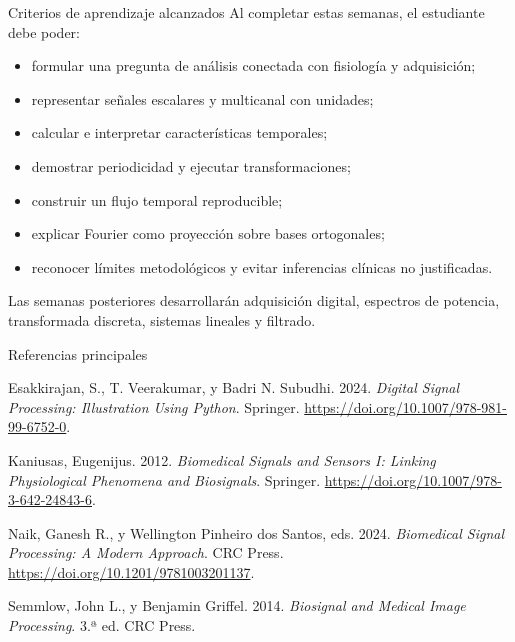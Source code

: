 \documentclass[
  ignorenonframetext,
  aspectratio=169,
  spanish,
  professionalfonts]{beamer}
\newlength{\cslhangindent}
\newenvironment{CSLReferences}[2] %
 {\begin{list}{}{%
  \setlength{\itemindent}{0pt}
  \setlength{\leftmargin}{0pt}
  \setlength{\parsep}{0pt}
  \ifodd #1
   \setlength{\leftmargin}{\cslhangindent}
   \setlength{\itemindent}{-1\cslhangindent}
  \fi
  \setlength{\itemsep}{#2\baselineskip}}}
 {\end{list}}
\providecommand{\tightlist}{%
  \setlength{\itemsep}{0pt}\setlength{\parskip}{0pt}}
\begin{document}
\begin{frame}{Criterios de aprendizaje alcanzados}
\protect{}\label{criterios-de-aprendizaje-alcanzados}
Al completar estas semanas, el estudiante debe poder:

\begin{itemize}
\tightlist
\item
  formular una pregunta de análisis conectada con fisiología y
  adquisición;
\item
  representar señales escalares y multicanal con unidades;
\item
  calcular e interpretar características temporales;
\item
  demostrar periodicidad y ejecutar transformaciones;
\item
  construir un flujo temporal reproducible;
\item
  explicar Fourier como proyección sobre bases ortogonales;
\item
  reconocer límites metodológicos y evitar inferencias clínicas no
  justificadas.
\end{itemize}

\begin{tcolorbox}[enhanced jigsaw, arc=.35mm, bottomrule=.15mm, bottomtitle=1mm, breakable, colback=white, colbacktitle=quarto-callout-note-color!10!white, colframe=quarto-callout-note-color-frame, coltitle=black, left=2mm, leftrule=.75mm, opacityback=0, opacitybacktitle=0.6, rightrule=.15mm, title={Siguiente etapa}, titlerule=0mm, toprule=.15mm, toptitle=1mm]

Las semanas posteriores desarrollarán adquisición digital, espectros de
potencia, transformada discreta, sistemas lineales y filtrado.

\end{tcolorbox}
\end{frame}

\begin{frame}[shrink]{Referencias principales}
\protect{}\label{referencias-principales}
\protect{}\label{refs}
\begin{CSLReferences}{1}{1}
Esakkirajan, S., T. Veerakumar, y Badri N. Subudhi. 2024. \emph{Digital
Signal Processing: Illustration Using Python}. Springer.
\url{https://doi.org/10.1007/978-981-99-6752-0}.

Kaniusas, Eugenijus. 2012. \emph{Biomedical Signals and Sensors I:
Linking Physiological Phenomena and Biosignals}. Springer.
\url{https://doi.org/10.1007/978-3-642-24843-6}.

Naik, Ganesh R., y Wellington Pinheiro dos Santos, eds. 2024.
\emph{Biomedical Signal Processing: A Modern Approach}. CRC Press.
\url{https://doi.org/10.1201/9781003201137}.

Semmlow, John L., y Benjamin Griffel. 2014. \emph{Biosignal and Medical
Image Processing}. 3.ª ed. CRC Press.

\end{CSLReferences}
\end{frame}
\end{document}
